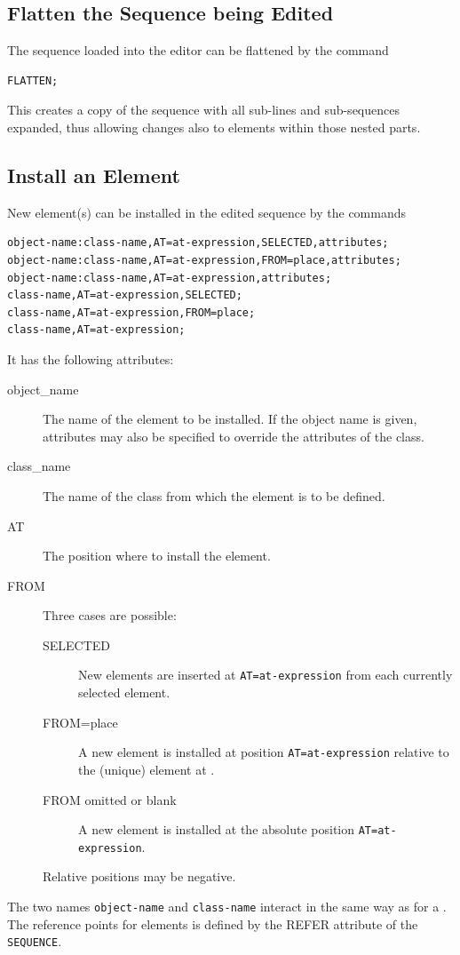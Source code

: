 \subsection{Flatten the Sequence being Edited}
\label{sec:editflat}
The sequence loaded into the editor can be flattened by the command
\begin{verbatim}
FLATTEN;
\end{verbatim}
This creates a copy of the sequence with all sub-lines and
sub-sequences expanded,
thus allowing changes also to elements within those nested parts.

\subsection{Install an Element}
\label{sec:editinstall}
New element(s) can be installed in the edited sequence by the commands
\begin{verbatim}
object-name:class-name,AT=at-expression,SELECTED,attributes;
object-name:class-name,AT=at-expression,FROM=place,attributes;
object-name:class-name,AT=at-expression,attributes;
class-name,AT=at-expression,SELECTED;
class-name,AT=at-expression,FROM=place;
class-name,AT=at-expression;
\end{verbatim}
It has the following attributes:
\begin{description}
\item[object\_name]
The name of the element to be installed.
If the object name is given, attributes may also be specified to
override the attributes of the class.
\item[class\_name]
The name of the class from which the element is to be defined.
\item[AT]
  The position where to install the element.
\item[FROM]
  Three cases are possible:
  \begin{description}
  \item[SELECTED]
    New elements are inserted at \texttt{AT=at-expression} from each
    currently selected element.
  \item[FROM=place]
    A new element is installed at position \texttt{AT=at-expression}
    relative to the (unique) element at .
  \item[FROM omitted or blank]
    A new element is installed at the absolute position
    \texttt{AT=at-expression}. 
  \end{description}
  Relative positions may be negative.
\end{description}
The two names \texttt{object-name} and \texttt{class-name} interact 
in the same way as for a .
The reference points for elements is defined by the REFER attribute of the 
\texttt{SEQUENCE}.

